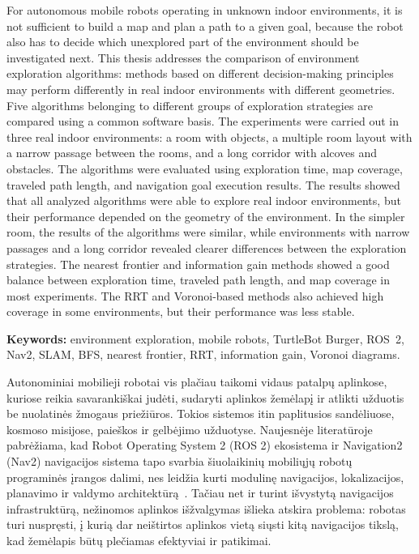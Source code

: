 \documentclass[]{VUMIFTemplateClass}
\begin{document}
For autonomous mobile robots operating in unknown indoor environments, it is not sufficient to build a map and plan a path to a given goal, because the robot
also has to decide which unexplored part of the environment should be investigated next. This thesis addresses the comparison of environment exploration
algorithms: methods based on different decision-making principles may perform differently in real indoor environments with different geometries. Five
algorithms belonging to different groups of exploration strategies are compared using a common software basis. The experiments were carried out in three real
indoor environments: a room with objects, a multiple room layout with a narrow passage between the rooms, and a long corridor with alcoves and obstacles. The
algorithms were evaluated using exploration time, map coverage, traveled path length, and navigation goal execution results. The results showed that all
analyzed algorithms were able to explore real indoor environments, but their performance depended on the geometry of the environment. In the simpler room, the
results of the algorithms were similar, while environments with narrow passages and a long corridor revealed clearer differences between the exploration
strategies. The nearest frontier and information gain methods showed a good balance between exploration time, traveled path length, and map coverage in most
experiments. The RRT and Voronoi-based methods also achieved high coverage in some environments, but their performance was less stable.

\textbf{Keywords:} environment exploration, mobile robots, TurtleBot Burger, ROS~2, Nav2, SLAM, BFS, nearest frontier, RRT, information gain, Voronoi diagrams.


Autonominiai mobilieji robotai vis plačiau taikomi vidaus patalpų aplinkose, kuriose reikia savarankiškai judėti, sudaryti aplinkos žemėlapį ir atlikti
užduotis be nuolatinės žmogaus priežiūros. Tokios sistemos itin paplitusios sandėliuose, kosmoso misijose, paieškos ir
gelbėjimo užduotyse. Naujesnėje literatūroje pabrėžiama, kad Robot Operating System 2 (ROS 2) ekosistema ir Navigation2 (Nav2) navigacijos sistema tapo svarbia šiuolaikinių mobiliųjų robotų
programinės įrangos dalimi, nes leidžia kurti modulinę navigacijos, lokalizacijos, planavimo ir valdymo architektūrą~\cite{macenski2022ros2,Nav2-Navigation}. Tačiau net ir turint išvystytą
navigacijos infrastruktūrą, nežinomos aplinkos išžvalgymas išlieka atskira problema: robotas turi nuspręsti, į kurią dar neištirtos aplinkos vietą siųsti kitą
navigacijos tikslą, kad žemėlapis būtų plečiamas efektyviai ir patikimai.
\end{document}
